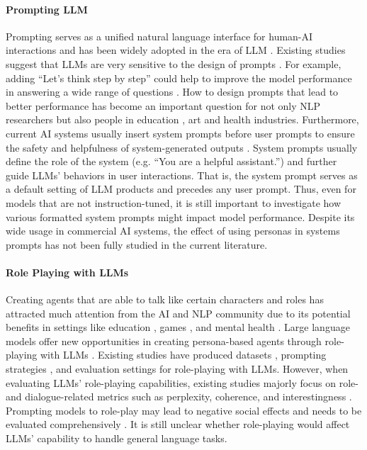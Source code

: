 \documentclass[11pt]{article}
\begin{document}
\paragraph{Prompting LLM}
Prompting serves as a unified natural language interface for human-AI interactions and has been widely adopted in the era of LLM \citep{liu2023pre}. Existing studies suggest that LLMs are very sensitive to the design of prompts \citep{lu2021fantastically}. For example, adding ``Let's think step by step'' could help to improve the model performance in answering a wide range of questions \citep{kojima2022large}. How to design prompts that lead to better performance has become an important question for not only NLP researchers but also people in education \citep{heston2023prompt}, art \citep{oppenlaender2022prompt} and health \cite{mesko2023prompt} industries. Furthermore, current AI systems usually insert system prompts before user prompts to ensure the safety and helpfulness of system-generated outputs \citep{touvron2023llama}. System prompts usually define the role of the system (e.g. ``You are a helpful assistant.'') and further guide LLMs' behaviors in user interactions. That is, the system prompt serves as a default setting of LLM products and precedes any user prompt. Thus, even for models that are not instruction-tuned, it is still important to investigate how various formatted system prompts might impact model performance. Despite its wide usage in commercial AI systems, the effect of using personas in systems prompts has not been fully studied in the current literature. 

\paragraph{Role Playing with LLMs}
Creating agents that are able to talk like certain characters and roles has attracted much attention from the AI and NLP community \citep{demasi2020multi} due to its potential benefits in settings like education \citep{pataranutaporn2021ai}, games \citep{miikkulainen2007creating}, and mental health \citep{denecke2020mental}. Large language models offer new opportunities in creating persona-based agents through role-playing with LLMs \citep{shanahan2023role}. Existing studies have produced datasets \citep{qian2021pchatbot}, prompting strategies \citep{kong2023better}, and evaluation settings \citep{wang2023rolellm} for role-playing with LLMs. However, when evaluating LLMs' role-playing capabilities, existing studies majorly focus on role- and dialogue-related metrics such as perplexity, coherence, and interestingness \citep{lin2020xpersona, deriu2021survey}. Prompting models to role-play may lead to negative social effects \cite{gupta2023bias} and needs to be evaluated comprehensively \cite{cheng2023compost}. It is still unclear whether role-playing would affect LLMs' capability to handle general language tasks. 
\end{document}
